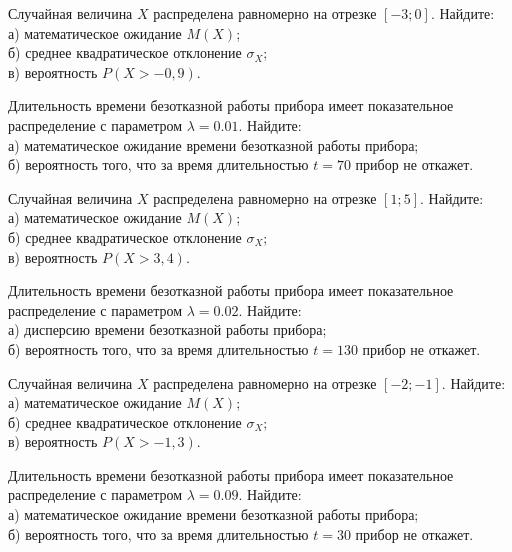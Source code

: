 \vfill

\newpage\setcounter{zad}{0}

\z Случайная величина $X$ распределена равномерно на отрезке $[-3; 0]$. Найдите: \\ \quad а) математическое ожидание $M(X)$; \\ \quad б) среднее квадратическое отклонение $\sigma_X$; \\ \quad в) вероятность $P(X>-0{,}9)$.


\vfill

\z Длительность времени безотказной работы прибора имеет показательное распределение с параметром $\lambda = 0.01$. Найдите: \\ \quad а) математическое ожидание времени безотказной работы прибора; \\ \quad б) вероятность того, что за время длительностью $t = 70$ прибор не откажет.
 

\vfill

\newpage\setcounter{zad}{0}

\z Случайная величина $X$ распределена равномерно на отрезке $[1; 5]$. Найдите: \\ \quad а) математическое ожидание $M(X)$; \\ \quad б) среднее квадратическое отклонение $\sigma_X$; \\ \quad в) вероятность $P(X>3{,}4)$.


\vfill

\z Длительность времени безотказной работы прибора имеет показательное распределение с параметром $\lambda = 0.02$. Найдите: \\ \quad а) дисперсию времени безотказной работы прибора; \\ \quad б) вероятность того, что за время длительностью $t = 130$ прибор не откажет.
 

\vfill

\newpage\setcounter{zad}{0}

\z Случайная величина $X$ распределена равномерно на отрезке $[-2; -1]$. Найдите: \\ \quad а) математическое ожидание $M(X)$; \\ \quad б) среднее квадратическое отклонение $\sigma_X$; \\ \quad в) вероятность $P(X>-1{,}3)$.


\vfill

\z Длительность времени безотказной работы прибора имеет показательное распределение с параметром $\lambda = 0.09$. Найдите: \\ \quad а) математическое ожидание времени безотказной работы прибора; \\ \quad б) вероятность того, что за время длительностью $t = 30$ прибор не откажет.
 


